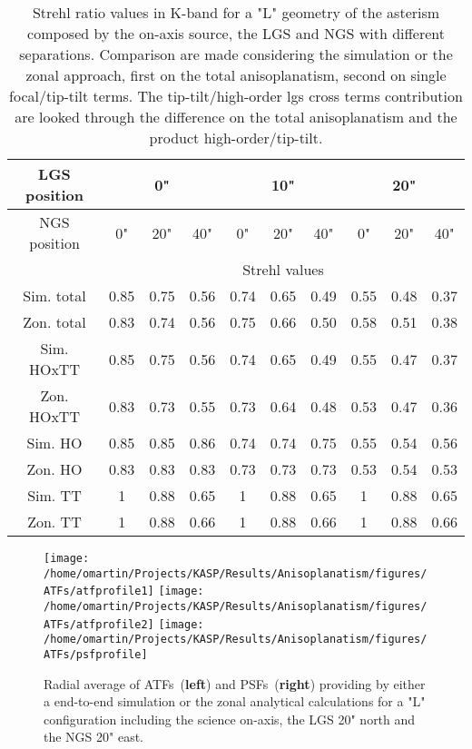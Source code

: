 \documentclass[12pt]{article}
\begin{document}
\begin{table}[h!] \label{T:strehl2}
	\centering
	\begin{tabular}{|c||c|c|c||c|c|c||c|c|c|}
	\hline
		LGS position & \multicolumn{3}{c||}{0"}& \multicolumn{3}{c||}{10"} & \multicolumn{3}{c|}{20"} \\
		\hline
		NGS position & 0" & 20" & 40" & 0"& 20"& 40"& 0"& 20"& 40"\\
		\hline
		& \multicolumn{9}{c|}{Strehl values} \\
		\hline
		Sim. total & 0.85&0.75&0.56&0.74&0.65&0.49&0.55&0.48 &0.37 \\
			\hline
		Zon. total & 0.83&0.74&0.56&0.75&0.66&0.50&0.58&0.51 &0.38 \\
			\hline
		Sim. HOxTT & 0.85&0.75&0.56&0.74&0.65&0.49&0.55&0.47 &0.37\\
			\hline
		Zon. HOxTT & 0.83&0.73&0.55&0.73&0.64&0.48&0.53&0.47 &0.36\\
			\hline
		Sim. HO    & 0.85&0.85&0.86&0.74&0.74&0.75&0.55&0.54 &0.56\\
			\hline
		Zon. HO    & 0.83&0.83&0.83&0.73&0.73&0.73&0.53&0.54 &0.53\\
			\hline
		Sim. TT    & 1   &0.88&0.65&1   &0.88&0.65&1   &0.88 &0.65\\
			\hline
		Zon. TT    & 1   &0.88&0.66&1   &0.88&0.66&1   &0.88 &0.66\\
		\hline
	\end{tabular}
\caption{Strehl ratio values in K-band for a "L" geometry of the asterism composed by the on-axis source, the LGS and NGS with different separations. Comparison are made considering the simulation or the zonal approach, first on the total anisoplanatism, second on single focal/tip-tilt terms. The tip-tilt/high-order lgs cross terms contribution are looked through the difference on the total anisoplanatism and the product high-order/tip-tilt.}
\end{table}

\begin{figure}[h!] \label{F:atfcut}
	\centering
	\texttt{[image: /home/omartin/Projects/KASP/Results/Anisoplanatism/figures/ATFs/atfprofile1]}\hspace{.5cm}
	\texttt{[image: /home/omartin/Projects/KASP/Results/Anisoplanatism/figures/ATFs/atfprofile2]}
	\texttt{[image: /home/omartin/Projects/KASP/Results/Anisoplanatism/figures/ATFs/psfprofile]}
	\caption{Radial average of ATFs~(\textbf{left}) and PSFs~(\textbf{right}) providing by either a end-to-end simulation or the zonal analytical calculations for a "L" configuration including the science on-axis, the LGS 20" north and the NGS 20" east.}
\end{figure}
\end{document}
